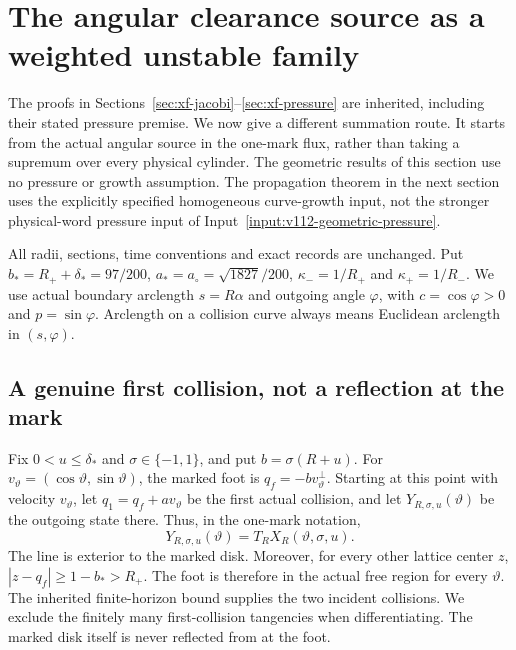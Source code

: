 \section{The angular clearance source as a weighted unstable family}
\label{sec:ag-source}
The proofs in Sections~\ref{sec:xf-jacobi}--\ref{sec:xf-pressure}
are inherited, including their stated pressure premise. We now give a
different summation route. It starts from the actual angular source
in the one-mark flux, rather than taking a supremum over every
physical cylinder. The geometric results of this section use no
pressure or growth assumption. The propagation theorem in the next
section uses the explicitly specified homogeneous curve-growth input,
not the stronger physical-word pressure input of
Input~\ref{input:v112-geometric-pressure}.

All radii, sections, time conventions and exact records are unchanged.
Put $b_*=R_++\delta_*=97/200$, $a_*=a_\circ=\sqrt{1827}/200$,
$\kappa_-=1/R_+$ and $\kappa_+=1/R_-$. We use actual boundary
arclength $s=R\alpha$ and outgoing angle $\varphi$, with
$c=\cos\varphi>0$ and $p=\sin\varphi$. Arclength on a collision
curve always means Euclidean arclength in $(s,\varphi)$.

\subsection{A genuine first collision, not a reflection at the mark}
Fix $0<u\le\delta_*$ and $\sigma\in\{-1,1\}$, and put
$b=\sigma(R+u)$. For $v_\vartheta=(\cos\vartheta,\sin\vartheta)$,
the marked foot is $q_f=-b v_\vartheta^\perp$. Starting at this
point with velocity $v_\vartheta$, let $q_1=q_f+a v_\vartheta$
be the first actual collision, and let $Y_{R,\sigma,u}(\vartheta)$
be the outgoing state there. Thus, in the one-mark notation,
\begin{equation}\label{eq:ag-first-image}
 Y_{R,\sigma,u}(\vartheta)=T_RX_R(\vartheta,\sigma,u).
\end{equation}
The line is exterior to the marked disk. Moreover, for every other
lattice center $z$, $|z-q_f|\ge1-b_*>R_+$. The foot is therefore
in the actual free region for every $\vartheta$. The inherited
finite-horizon bound supplies the two incident collisions. We exclude
the finitely many first-collision tangencies when differentiating.
The marked disk itself is never reflected from at the foot.

